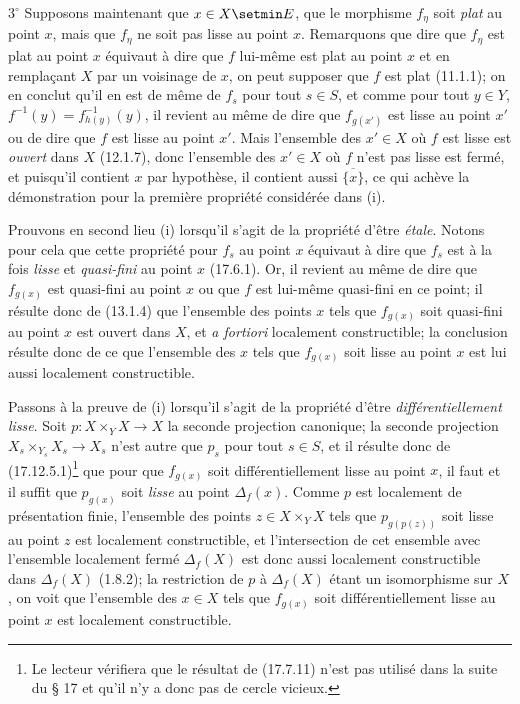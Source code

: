 $3^\circ$ Supposons maintenant que $x\in X\setmin E$, que le morphisme $f_\eta$ soit \emph{plat} au point $x$, mais que $f_\eta$ ne soit pas lisse au point $x$. Remarquons que dire que $f_\eta$ est plat au point $x$ équivaut à dire que $f$ lui-même est plat au point $x$ et en remplaçant $X$ par un voisinage de $x$, on peut supposer que $f$ est plat (11.1.1); on en conclut qu'il en est de même de $f_s$ pour tout $s\in S$, et comme pour tout $y\in Y$, $f^{-1}(y)=f_{h(y)}^{-1}(y)$, il revient au même de dire que $f_{g(x')}$ est lisse au point $x'$ ou de dire que $f$ est lisse au point $x'$. Mais l'ensemble des $x'\in X$ où $f$ est lisse est \emph{ouvert} dans $X$ (12.1.7), donc l'ensemble des $x'\in X$ où $f$ n'est pas lisse est fermé, et puisqu'il contient $x$ par hypothèse, il contient aussi $\overline{\{x\}}$, ce qui achève la démonstration pour la première propriété considérée dans (i).

Prouvons en second lieu (i) lorsqu'il s'agit de la propriété d'être \emph{étale}. Notons pour cela que cette propriété pour $f_s$ au point $x$ équivaut à dire que $f_s$ est à la fois \emph{lisse} et \emph{quasi-fini} au point $x$ (17.6.1). Or, il revient au même de dire que $f_{g(x)}$ est quasi-fini au point $x$ ou que $f$ est lui-même quasi-fini en ce point; il résulte donc de (13.1.4) que l'ensemble des points $x$ tels que $f_{g(x)}$ soit quasi-fini au point $x$ est ouvert dans $X$, et \emph{a fortiori} localement constructible; la conclusion résulte donc de ce que l'ensemble des $x$ tels que $f_{g(x)}$ soit lisse au point $x$ est lui aussi localement constructible.

Passons à la preuve de (i) lorsqu'il s'agit de la propriété d'être \emph{différentiellement lisse}. Soit $p:X\times_Y X\to X$ la seconde projection canonique; la seconde projection $X_s\times_{Y_s}X_s\to X_s$ n'est autre que $p_s$ pour tout $s\in S$, et il résulte donc de (17.12.5.1)\footnote{Le lecteur vérifiera que le résultat de (17.7.11) n'est pas utilisé dans la suite du § 17 et qu'il n'y a donc pas de cercle vicieux.} que pour que $f_{g(x)}$ soit différentiellement lisse au point $x$, il faut et il suffit que $p_{g(x)}$ soit \emph{lisse} au point $\Delta_f(x)$. Comme $p$ est localement de présentation finie, l'ensemble des points $z\in X\times_Y X$ tels que $p_{g(p(z))}$ soit lisse au point $z$ est localement constructible, et l'intersection de cet ensemble avec l'ensemble localement fermé $\Delta_f(X)$ est donc aussi localement constructible dans $\Delta_f(X)$ (1.8.2); la restriction de $p$ à $\Delta_f(X)$ étant un isomorphisme sur $X$, on voit que l'ensemble des $x\in X$ tels que $f_{g(x)}$ soit différentiellement lisse au point $x$ est localement constructible.

